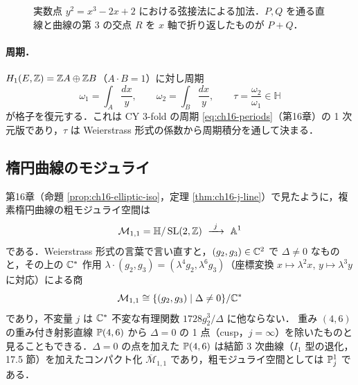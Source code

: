 \begin{figure}[H]
\centering
{}
\caption{実数点 $y^2=x^3-2x+2$ における弦接法による加法．$P,Q$ を通る直線と曲線の第 3 の交点 $R$ を $x$ 軸で折り返したものが $P+Q$．}
\label{fig:ch17-group-law}
\end{figure}

\paragraph{周期．}
$H_1(E,\mathbb{Z})=\mathbb{Z} A\oplus\mathbb{Z} B$（$A\cdot B=1$）に対し周期
\[
\omega_1=\int_A\frac{dx}{y},\qquad \omega_2=\int_B\frac{dx}{y},\qquad \tau=\frac{\omega_2}{\omega_1}\in\mathbb{H}
\]
が格子を復元する．これは CY 3-fold の周期 \eqref{eq:ch16-periods}（第16章）の 1 次元版であり，$\tau$ は Weierstrass 形式の係数から周期積分を通して決まる．

\subsection{楕円曲線のモジュライ}

第16章（命題 \ref{prop:ch16-elliptic-iso}，定理 \ref{thm:ch16-j-line}）で見たように，複素楕円曲線の粗モジュライ空間は
\[
\mathcal{M}_{1,1}=\mathbb{H}/\SL(2,\Z)\ \xrightarrow{\ j\ }\ \A^1
\]
である．Weierstrass 形式の言葉で言い直すと，$(g_2,g_3)\in\mathbb{C}^2$ で $\Delta\ne0$ なものと，その上の $\mathbb{C}^*$ 作用 $\lambda\cdot(g_2,g_3)=(\lambda^4g_2,\lambda^6g_3)$（座標変換 $x\mapsto\lambda^2x$, $y\mapsto\lambda^3y$ に対応）による商
\[
\mathcal{M}_{1,1}\cong\{(g_2,g_3)\mid\Delta\ne0\}/\mathbb{C}^*
\]
であり，不変量 $j$ は $\mathbb{C}^*$ 不変な有理関数 $1728g_2^3/\Delta$ に他ならない．
重み $(4,6)$ の重み付き射影直線 $\mathbb{P}(4,6)$ から $\Delta=0$ の 1 点（cusp，$j=\infty$）を除いたものと見ることもできる．$\Delta=0$ の点を加えた $\mathbb{P}(4,6)$ は結節 3 次曲線（$I_1$ 型の退化，17.5 節）を加えたコンパクト化 $\overline{\mathcal{M}}_{1,1}$ であり，粗モジュライ空間としては $\mathbb{P}^1_j$ である．

